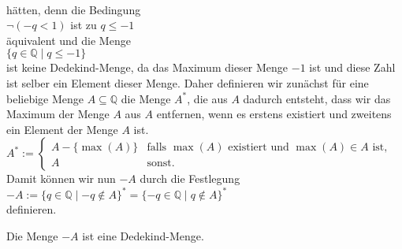 \\[0.2cm]  
h\"atten, denn die Bedingung 
\\[0.2cm]
\hspace*{1.3cm}
$\neg (-q < 1)$ \quad ist zu  \quad $q \leq -1$
\\[0.2cm]
\"aquivalent und die Menge
\\[0.2cm]
\hspace*{1.3cm}
$\{ q \in \mathbb{Q} \mid q \leq -1 \}$
\\[0.2cm]
ist keine Dedekind-Menge, da das Maximum dieser Menge $-1$ ist und diese Zahl ist selber ein Element
dieser Menge.  Daher definieren wir zun\"achst f\"ur eine beliebige Menge $A \subseteq \mathbb{Q}$ die
Menge $A^*$, die aus $A$ dadurch entsteht, dass wir das Maximum der Menge $A$ aus $A$ entfernen,
wenn es erstens existiert und zweitens ein Element der Menge $A$ ist.
\\[0.2cm]
\hspace*{1.3cm}
$A^* := \left\{
\begin{array}{ll}
 A - \{ \max(A) \} & \mbox{falls $\max(A)$ existiert und $\max(A) \in A$ ist,} \\
 A                 & \mbox{sonst}.
\end{array}\right.
$
\\[0.2cm]
Damit k\"onnen wir nun $-A$ durch die Festlegung
\\[0.2cm]
\hspace*{1.3cm}
$-\!A := \{ q \in \mathbb{Q} \mid -q \not\in A \}^* = \{ -q \in \mathbb{Q} \mid q \not\in A \}^*$
\\[0.2cm]
definieren.


\begin{Satz}
  Die Menge $-\!A$ ist eine Dedekind-Menge.  \eox
\end{Satz}

